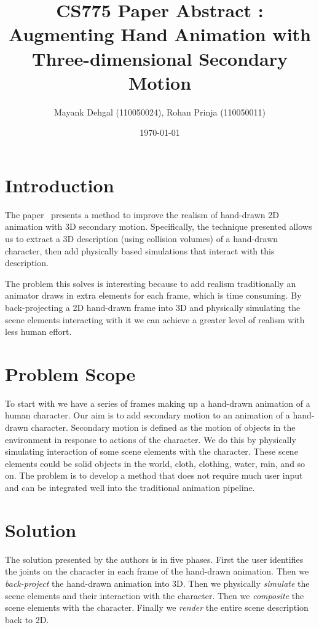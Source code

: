 \documentclass[a4paper,9pt]{article}
\title{CS775 Paper Abstract : Augmenting Hand Animation with Three-dimensional Secondary Motion}
\author{Mayank Dehgal (110050024), Rohan Prinja (110050011)}
\date{\today}
\begin{document}
\maketitle

\section{Introduction}
The paper~\cite{Aug10} presents a method to improve the realism of hand-drawn 2D animation with 3D secondary motion. Specifically, the technique presented allows us to extract a 3D description (using collision volumes) of a hand-drawn character, then add physically based simulations that interact with this description.

The problem this solves is interesting because to add realism traditionally an animator draws in extra elements for each frame, which is time consuming. By back-projecting a 2D hand-drawn frame into 3D and physically simulating the scene elements interacting with it we can achieve a greater level of realism with less human effort.

\section{Problem Scope}
To start with we have a series of frames making up a hand-drawn animation of a human character. Our aim is to add secondary motion to an animation of a hand-drawn character. Secondary motion is defined as the motion of objects in the environment in response to actions of the character. We do this by physically simulating interaction of some scene elements with the character. These scene elements could be solid objects in the world, cloth, clothing, water, rain, and so on. The problem is to develop a method that does not require much user input and can be integrated well into the traditional animation pipeline.

\section{Solution}
The solution presented by the authors is in five phases. First the user identifies the joints on the character in each frame of the hand-drawn animation. Then we \textit{back-project} the hand-drawn animation into 3D. Then we physically \textit{simulate} the scene elements and their interaction with the character. Then we \textit{composite} the scene elements with the character. Finally we \textit{render} the entire scene description back to 2D.
\end{document}
